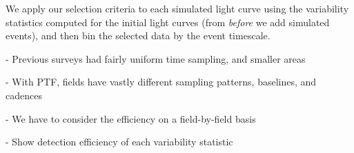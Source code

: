 \documentclass[12pt,preprint]{aastex}
\begin{document}
We apply our selection criteria to each simulated light curve using the variability statistics computed for the initial light curves (from \textit{before} we add simulated events), and then bin the selected data by the event timescale. 

- Previous surveys had fairly uniform time sampling, and smaller areas

- With PTF, fields have vastly different sampling patterns, baselines, and cadences

- We have to consider the efficiency on a field-by-field basis

- Show detection efficiency of each variability statistic





\end{document}
